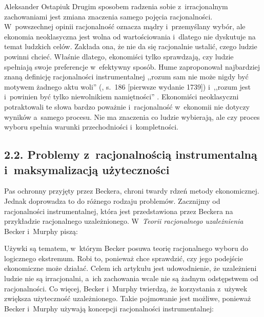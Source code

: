 \begin{artplenv}{Aleksander Ostapiuk}
Drugim sposobem radzenia sobie z~irracjonalnym zachowaniami jest zmiana znaczenia samego pojęcia racjonalności.
W~powszechnej opinii racjonalność oznacza mądry i~przemyślany wybór, ale ekonomia neoklasyczna jest wolna od
wartościowania i~dlatego nie dyskutuje na temat ludzkich celów. Zakłada ona, że nie da się racjonalnie ustalić, czego
ludzie powinni chcieć. Właśnie dlatego, ekonomiści tylko sprawdzają, czy ludzie spełniają swoje preferencje w~efektywny
sposób. Hume zaproponował najbardziej znaną definicję racjonalności instrumentalnej ,,rozum sam nie może nigdy być
motywem żadnego aktu woli''
(\cite{hume_traktat_1963}, s.~186 [pierwsze wydanie 1739])
i~,,rozum
jest i~powinien być tylko niewolnikiem namiętności''
\parencite[s.~188]{hume_traktat_1963}.
Ekonomiści neoklasyczni
potraktowali te słowa bardzo poważnie i~racjonalność w~ekonomii nie dotyczy wyników a~samego procesu. Nie ma znaczenia
co ludzie wybierają, ale czy proces wyboru spełnia warunki przechodniości i~kompletności. 

\subsection{2.2. Problemy z~racjonalnością instrumentalną i~maksymalizacją użyteczności}
Pas ochronny przyjęty przez Beckera, chroni twardy rdzeń metody ekonomicznej. Jednak doprowadza to do różnego rodzaju
problemów. Zacznijmy od racjonalności instrumentalnej, która jest przedstawiona przez Beckera na przykładzie
racjonalnego uzależnionego. W~\textit{Teorii racjonalnego uzależnienia} Becker i~Murphy piszą: 


Używki są tematem, w~którym Becker posuwa teorię racjonalnego wyboru do logicznego ekstremum. Robi to, ponieważ chce
sprawdzić, czy jego podejście ekonomiczne może działać. Celem ich artykułu jest udowodnienie, że uzależnieni ludzie nie
są irracjonalni, a~ich zachowania wcale nie są żadnym odstępstwem od racjonalności. Co więcej, Becker i~Murphy
twierdzą, że korzystania z~używek zwiększa użyteczność uzależnionego. Takie pojmowanie jest możliwe, ponieważ
Becker i~Murphy używają koncepcji racjonalności instrumentalnej: 


\end{artplenv}
